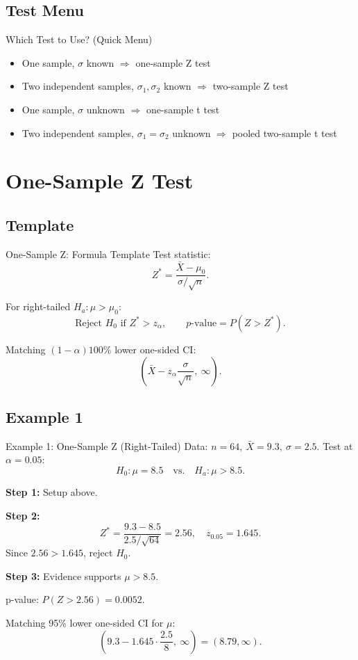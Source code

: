 \documentclass[aspectratio=169]{beamer}
\begin{document}
\subsection{Test Menu}
\begin{frame}{Which Test to Use? (Quick Menu)}
  \begin{itemize}
    \item One sample, \(\sigma\) known \(\Rightarrow\) one-sample Z test
    \item Two independent samples, \(\sigma_1,\sigma_2\) known \(\Rightarrow\) two-sample Z test
    \item One sample, \(\sigma\) unknown \(\Rightarrow\) one-sample t test
    \item Two independent samples, \(\sigma_1=\sigma_2\) unknown \(\Rightarrow\) pooled two-sample t test
  \end{itemize}
\end{frame}

\section{One-Sample Z Test}

\subsection{Template}
\begin{frame}{One-Sample Z: Formula Template}
  Test statistic:
  \[
    Z^*=\frac{\bar X-\mu_0}{\sigma/\sqrt{n}}.
  \]

  For right-tailed \(H_a:\mu>\mu_0\):
  \[
    \text{Reject }H_0\text{ if }Z^*>z_{\alpha},
    \qquad
    p\text{-value}=P(Z>Z^*).
  \]

  Matching \((1-\alpha)100\%\) lower one-sided CI:
  \[
    \left(\bar X-z_{\alpha}\frac{\sigma}{\sqrt{n}},\ \infty\right).
  \]
\end{frame}

\subsection{Example 1}
\begin{frame}{Example 1: One-Sample Z (Right-Tailed)}
  Data: \(n=64,\ \bar X=9.3,\ \sigma=2.5\). Test at \(\alpha=0.05\):
  \[
    H_0:\mu=8.5
    \quad\text{vs.}\quad
    H_a:\mu>8.5.
  \]

  \textbf{Step 1:} Setup above.

  \textbf{Step 2:}
  \[
    Z^*=\frac{9.3-8.5}{2.5/\sqrt{64}}=2.56,
    \quad
    z_{0.05}=1.645.
  \]
  Since \(2.56>1.645\), reject \(H_0\).

  \textbf{Step 3:} Evidence supports \(\mu>8.5\).

  \vspace{1mm}
  p-value: \(P(Z>2.56)=0.0052\).

  Matching 95\% lower one-sided CI for \(\mu\):
  \[
    \left(9.3-1.645\cdot\frac{2.5}{8},\ \infty\right)
    =(8.79,\infty).
  \]
\end{frame}
\end{document}
